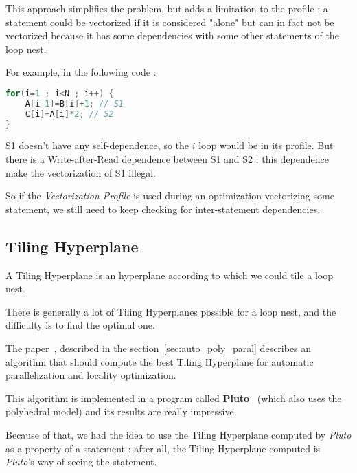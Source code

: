 \documentclass[paper=a4, fontsize=11.5pt]{scrartcl}
\numberwithin{equation}{section}        %
\numberwithin{figure}{section}          %
\numberwithin{table}{section}               %
\begin{document}
        This approach simplifies the problem, but adds a limitation to the profile :
        a statement could be vectorized if it is considered "alone" but can in fact not
        be vectorized because it has some dependencies with some other statements of the loop
        nest.

        For example, in the following code :
\begin{lstlisting}[frame=single, language=C, caption={Vectorization Profile limitation example}, label={lst:vectorization_limitation}]
for(i=1 ; i<N ; i++) {
    A[i-1]=B[i]+1; // S1
    C[i]=A[i]*2; // S2
}
\end{lstlisting}
    S1 doesn't have any \gls{self-dependence}, so the $i$ loop would be in its
    profile. But there is a Write-after-Read dependence between S1 and S2 : this dependence
    make the vectorization of S1 illegal.

    So if the \textit{Vectorization Profile} is used during an optimization vectorizing
    some statement, we still need to keep checking for inter-statement dependencies.


    \subsection{Tiling Hyperplane}
        A Tiling Hyperplane is an hyperplane according to which we could tile a loop nest.
        
        There is generally a lot of Tiling Hyperplanes possible for a loop nest, and the difficulty
        is to find the optimal one.

        The paper~\cite{Bondhugula:2008:PAP:1379022.1375595}, described in the section~\ref{sec:auto_poly_paral}
        describes an algorithm that should compute the best Tiling Hyperplane for automatic
        parallelization and locality optimization.

        This algorithm is implemented in a program called \textbf{Pluto}~\cite{pluto} (which also
        uses the polyhedral model) and its results are really impressive.

        Because of that, we had the idea to use the Tiling Hyperplane computed by \textit{Pluto}
        as a property of a statement : after all, the Tiling Hyperplane computed is
        \textit{Pluto}'s way of seeing the statement.
\end{document}
